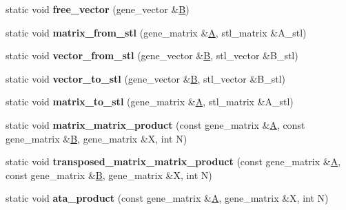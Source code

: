 \begin{DoxyCompactItemize}
static void {\bfseries free\+\_\+vector} (gene\+\_\+vector \&\hyperlink{group___core___module_class_eigen_1_1_matrix}{B})
\item 
\mbox{\label{classgmm__interface_a0017598ebb0651e556ccf7a2080efde5}} 
static void {\bfseries matrix\+\_\+from\+\_\+stl} (gene\+\_\+matrix \&\hyperlink{group___core___module_class_eigen_1_1_matrix}{A}, stl\+\_\+matrix \&A\+\_\+stl)
\item 
\mbox{\label{classgmm__interface_a695e75d14e15e7e942cbcb083b27e745}} 
static void {\bfseries vector\+\_\+from\+\_\+stl} (gene\+\_\+vector \&\hyperlink{group___core___module_class_eigen_1_1_matrix}{B}, stl\+\_\+vector \&B\+\_\+stl)
\item 
\mbox{\label{classgmm__interface_a268696c22120ed1a4145224c668e6a25}} 
static void {\bfseries vector\+\_\+to\+\_\+stl} (gene\+\_\+vector \&\hyperlink{group___core___module_class_eigen_1_1_matrix}{B}, stl\+\_\+vector \&B\+\_\+stl)
\item 
\mbox{\label{classgmm__interface_ac0d36266a607a0834ab7c3a0916f3a09}} 
static void {\bfseries matrix\+\_\+to\+\_\+stl} (gene\+\_\+matrix \&\hyperlink{group___core___module_class_eigen_1_1_matrix}{A}, stl\+\_\+matrix \&A\+\_\+stl)
\item 
\mbox{\label{classgmm__interface_aa5ad7ea760e34c5e20ce806a00611d75}} 
static void {\bfseries matrix\+\_\+matrix\+\_\+product} (const gene\+\_\+matrix \&\hyperlink{group___core___module_class_eigen_1_1_matrix}{A}, const gene\+\_\+matrix \&\hyperlink{group___core___module_class_eigen_1_1_matrix}{B}, gene\+\_\+matrix \&X, int N)
\item 
\mbox{\label{classgmm__interface_a8a4ee623e9b3b3e51bf8ddb423463f41}} 
static void {\bfseries transposed\+\_\+matrix\+\_\+matrix\+\_\+product} (const gene\+\_\+matrix \&\hyperlink{group___core___module_class_eigen_1_1_matrix}{A}, const gene\+\_\+matrix \&\hyperlink{group___core___module_class_eigen_1_1_matrix}{B}, gene\+\_\+matrix \&X, int N)
\item 
\mbox{\label{classgmm__interface_adf15f35fd991837fb414f799623d3daf}} 
static void {\bfseries ata\+\_\+product} (const gene\+\_\+matrix \&\hyperlink{group___core___module_class_eigen_1_1_matrix}{A}, gene\+\_\+matrix \&X, int N)

\end{DoxyCompactItemize}

